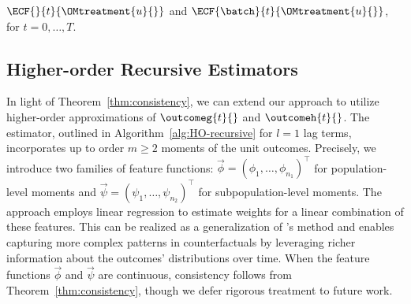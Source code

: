\begin{algorithm}
\begin{algorithmic}
\Ensure $\ECF{}{t}{\OMtreatment{u}{}}$ and $\ECF{\batch}{t}{\OMtreatment{u}{}}$, for $t = 0, \ldots, T$.
% 
\end{algorithmic}
\end{algorithm}
% 



\subsection{Higher-order Recursive Estimators}
\label{apndx:HO_recursive_estimators}
% 
In light of Theorem~\ref{thm:consistency}, we can extend our approach to utilize higher-order approximations of $\outcomeg{t}{}$ and $\outcomeh{t}{}$. The estimator, outlined in Algorithm~\ref{alg:HO-recursive} for $l=1$ lag terms, incorporates up to order $m \geq 2$ moments of the unit outcomes. Precisely, we introduce two families of feature functions: $\Vec\phi = (\phi_1, \ldots, \phi_{n_1})^\top$ for population-level moments and $\Vec\psi = (\psi_1, \ldots, \psi_{n_2})^\top$ for subpopulation-level moments. The approach employs linear regression to estimate weights for a linear combination of these features. This can be realized as a generalization of \cite{bayati2024higher}'s method and enables capturing more complex patterns in counterfactuals by leveraging richer information about the outcomes' distributions over time. When the feature functions $\Vec\phi$ and $\Vec\psi$ are continuous, consistency follows from Theorem~\ref{thm:consistency}, though we defer rigorous treatment to future work.


